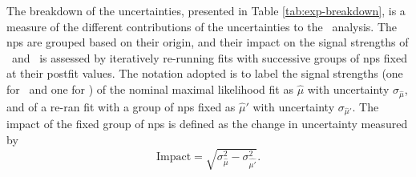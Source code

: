 The breakdown of the uncertainties, presented in Table \ref{tab:exp-breakdown}, is a measure of the different contributions of the uncertainties to the \vhbc\ analysis. The \glspl{np} are grouped based on their origin, and their impact on the signal strengths of \vhb\ and \vhc\ is assessed by iteratively re-running fits with successive groups of \glspl{np} fixed at their postfit values. The notation adopted is to label the signal strengths (one for \vhb\ and one for \vhc) of the nominal maximal likelihood fit as $\hat{\mu}$ with uncertainty $\sigma_{\hat{\mu}}$, and of a re-ran fit with a group of \glspl{np} fixed as $\hat{\mu}'$ with uncertainty $\sigma_{\hat{\mu}'}$. The impact of the fixed group of \glspl{np} is defined as the change in uncertainty measured by 
\begin{equation}
    \text{Impact} = \sqrt{\sigma^2_{\hat{\mu}} - \sigma^2_{\hat{\mu'}}}.
\end{equation}

